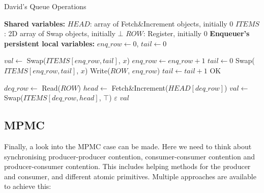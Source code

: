 \begin{algorithm}[!ht]
    \centering
    \captionsetup{justification=centering}
    \caption{David's Queue Operations \cite{Mateíspmc}}
    \label{alg:david-queue}
    \scriptsize
    \begin{algorithmic}[1]
        \State \textbf{Shared variables:}
        \State $HEAD$: array of Fetch\&Increment objects, initially 0
        \State $ITEMS$: 2D array of Swap objects, initially $\bot$
        \State $ROW$: Register, initially 0
        \State
        \State \textbf{Enqueuer's persistent local variables:}
        \State $enq\_row \gets 0$, $tail \gets 0$
        
        \State
        
         
            \State $val \gets$ Swap($ITEMS[enq\_row, tail]$, $x$) 
             
                \State $enq\_row \gets enq\_row + 1$ 
                \State $tail \gets 0$
                \State Swap($ITEMS[enq\_row, tail]$, $x$) 
                \State Write($ROW$, $enq\_row$) 
            \EndIf
            \State $tail \gets tail + 1$
            \State \Return OK
        \EndProcedure
        
        \State
        
         
            \State $deq\_row \gets$ Read($ROW$) 
            \State $head \gets$ Fetch\&Increment($HEAD[deq\_row]$) 
            \State $val \gets$ Swap($ITEMS[deq\_row, head]$, $\top$) 
             
                \State \Return $\varepsilon$ 
            \Else
                \State \Return $val$ 
            \EndIf
        \EndFunction
    \end{algorithmic}
\end{algorithm}

\subsection{\acf{MPMC}}\label{subsec:multiple-producer-and-multiple-consumer}
Finally, a look into the \ac{MPMC} case can be made. Here we need to think about synchronising producer-producer contention, consumer-consumer contention and producer-consumer contention. This includes helping methods for the producer and consumer, and different atomic primitives. Multiple approaches are available to achieve this:

